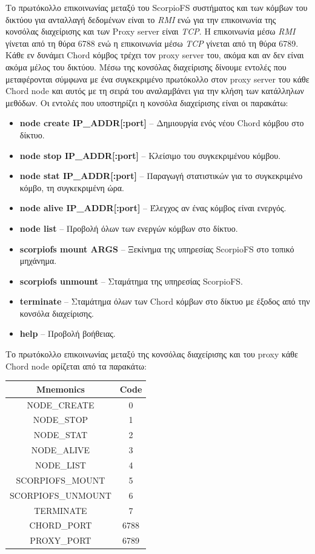\documentclass[a4paper]{article}
\begin{document}
Το πρωτόκολλο επικοινωνίας μεταξύ του ScorpioFS συστήματος και των κόμβων του
δικτύου για ανταλλαγή δεδομένων είναι το \emph{RMI} ενώ για την επικοινωνία της
κονσόλας διαχείρισης και των Proxy server είναι \emph{TCP}. Η επικοινωνία μέσω
\emph{RMI} γίνεται από τη θύρα 6788 ενώ η επικοινωνία μέσω \emph{TCP} γίνεται
από τη θύρα 6789. Κάθε εν δυνάμει Chord κόμβος τρέχει τον proxy server του, ακόμα και αν δεν είναι ακόμα μέλος του δικτύου. Μέσω της κονσόλας διαχείρισης δίνουμε εντολές που μεταφέρονται σύμφωνα με ένα συγκεκριμένο πρωτόκολλο στον proxy server του κάθε Chord node και αυτός με τη σειρά του αναλαμβάνει για την κλήση των κατάλληλων μεθόδων. Οι εντολές που υποστηρίζει η κονσόλα διαχείρισης είναι οι παρακάτω:
\begin{itemize}
    \item \textbf{node create IP\_ADDR[:port]} -- Δημιουργία ενός νέου Chord
κόμβου στο δίκτυο.
    \item \textbf{node stop IP\_ADDR[:port]} -- Κλείσιμο του συγκεκριμένου
κόμβου.
    \item \textbf{node stat IP\_ADDR[:port]} -- Παραγωγή στατιστικών για το
συγκεκριμένο κόμβο, τη συγκεκριμένη ώρα.
    \item \textbf{node alive IP\_ADDR[:port]} -- Έλεγχος αν ένας κόμβος είναι
ενεργός.
    \item \textbf{node list} -- Προβολή όλων των ενεργών κόμβων στο δίκτυο.
    \item \textbf{scorpiofs mount ARGS} -- Ξεκίνημα της υπηρεσίας ScorpioFS στο
τοπικό μηχάνημα.
    \item \textbf{scorpiofs unmount} -- Σταμάτημα της υπηρεσίας ScorpioFS.
    \item \textbf{terminate} -- Σταμάτημα όλων των Chord κόμβων στο δίκτυο με
έξοδος από την κονσόλα διαχείρισης.
    \item \textbf{help} -- Προβολή βοήθειας.
\end{itemize}

Το πρωτόκολλο επικοινωνίας μεταξύ της κονσόλας διαχείρισης και του proxy κάθε
Chord node ορίζεται από τα παρακάτω:

\begin{center}
\begin{tabular}{|c|c|}
\hline
\textbf{Mnemonics} & \textbf{Code}\\
\hline
\hline
NODE\_CREATE & 0\\
\hline
NODE\_STOP & 1\\
\hline
NODE\_STAT & 2\\
\hline
NODE\_ALIVE & 3\\
\hline
NODE\_LIST & 4\\
\hline
SCORPIOFS\_MOUNT & 5\\
\hline
SCORPIOFS\_UNMOUNT & 6\\
\hline
TERMINATE & 7\\
\hline
CHORD\_PORT & 6788\\
\hline
PROXY\_PORT & 6789\\
\hline
\end{tabular}
\end{center}
\end{document}
